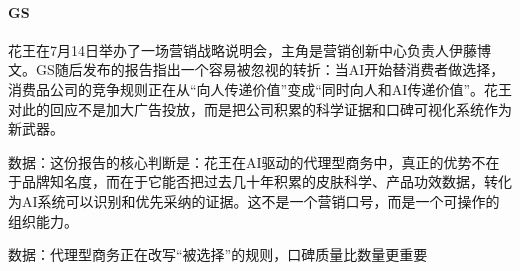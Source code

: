 \documentclass[11pt]{ctexart}
\begin{document}
\paragraph{GS} 花王在7月14日举办了一场营销战略说明会，主角是营销创新中心负责人伊藤博文。GS随后发布的报告指出一个容易被忽视的转折：当AI开始替消费者做选择，消费品公司的竞争规则正在从“向人传递价值”变成“同时向人和AI传递价值”。花王对此的回应不是加大广告投放，而是把公司积累的科学证据和口碑可视化系统作为新武器。
{\small\color{refgray}数据：这份报告的核心判断是：花王在AI驱动的代理型商务中，真正的优势不在于品牌知名度，而在于它能否把过去几十年积累的皮肤科学、产品功效数据，转化为AI系统可以识别和优先采纳的证据。这不是一个营销口号，而是一个可操作的组织能力。\par}
{\small\color{refgray}数据：代理型商务正在改写“被选择”的规则，口碑质量比数量更重要\par}
\end{document}
